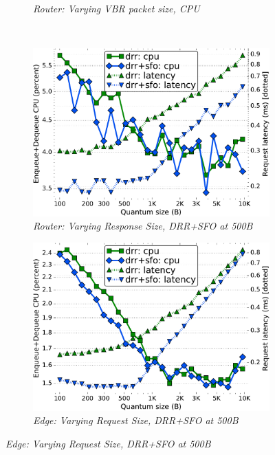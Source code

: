 \begin{figure}[th!]
\begin{subfigure}[t]{.30\linewidth}
    \caption{\small{\textit{Router: Varying VBR packet size, CPU}}}
    \label{fig:vbr-1456-cpu-full}
  \end{subfigure}
  \\
  \begin{subfigure}[t]{.30\linewidth}
    \centering
    \includegraphics[width=0.95\linewidth]{figs/burst_cn_2t4x8_mn_2tb2x4_crs_500_kp_lat_drr_basic_fq_drr.pdf}
    \caption{\small{\textit{Router: Varying Response Size, DRR+SFO at 500B}}}
    \label{fig:reply-1456-drr-full}
  \end{subfigure}
  \begin{subfigure}[t]{.30\linewidth}
    \centering
    \includegraphics[width=0.95\linewidth]{figs/burst_edge_cn_2t1x32_mn_2tb1x8_mss_1468_kp_lat_drr_basic_fq_drr.pdf}
    \caption{\small{\textit{Edge: Varying Request Size, DRR+SFO at 500B}}}
    \label{fig:request-edge-1456-drr-full}

\end{subfigure}
\end{figure}
